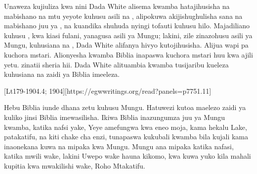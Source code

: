 Unaweza kujiuliza kwa nini Dada White alisema kwamba hatajihusisha na mabishano na mtu yeyote kuhusu asili na , alipokuwa akijishughulisha sana na mabishano juu ya , na kuandika shuhuda nyingi tofauti kuhusu hilo. Majadiliano kuhusu , kwa kiasi fulani, yanagusa asili ya Mungu; lakini, zile zinazohusu asili ya Mungu, kuhusiana na , Dada White alifanya hivyo kutojihusisha. Alijua wapi pa kuchora mstari. Alionyesha kwamba Biblia inapaswa kuchora mstari huu kwa ajili yetu.   zinatii sheria hii. Dada White alituambia kwamba tusijaribu kueleza kuhusiana na  zaidi ya Biblia imeeleza.


[Lt179-1904.4; 1904][https://egwwritings.org/read?panels=p7751.11]


Hebu Biblia iunde dhana zetu kuhusu Mungu. Hatuwezi kutoa maelezo zaidi ya  kuliko jinsi Biblia imewasilisha. Ikiwa Biblia inazungumza juu ya Mungu kwamba, katika nafsi yake, Yeye amefungwa kwa eneo moja, kama hekalu Lake, patakatifu, na kiti chake cha enzi, tunapaswa kukubali kwamba bila kujali kama inaonekana kuwa na mipaka kwa Mungu. Mungu ana mipaka katika nafasi, katika mwili wake, lakini Uwepo wake hauna kikomo, kwa kuwa yuko kila mahali kupitia kwa mwakilishi wake, Roho Mtakatifu.


